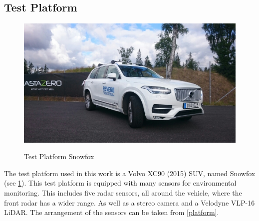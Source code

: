 \subsection{Test Platform}

\begin{figure}[!ht]
\caption{Test Platform Snowfox}
\includegraphics[width=\columnwidth]{bilder/snowfox.jpg}
\label{snowfox}
\end{figure}


The test platform used in this work is a Volvo XC90 (2015) SUV, named Snowfox (see \cref{snowfox}). 
This test platform is equipped with many sensors for environmental monitoring. This includes five radar sensors, all around the vehicle, where the front radar has a wider range.
As well as a stereo camera and a Velodyne VLP-16 LiDAR. The arrangement of the sensors can be taken from \cref{platform}.


